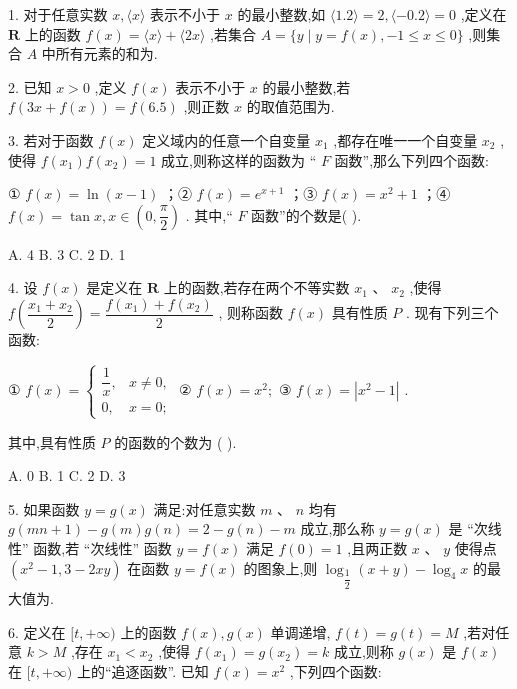 1. 对于任意实数 $x,\langle x\rangle$ 表示不小于 $x$ 的最小整数,如 $\langle {1.2}\rangle  = 2,\langle  - {0.2}\rangle  = 0$ ,定义在 $\mathbf{R}$ 上的函数 $f\left( x\right)  = \langle x\rangle  + \langle {2x}\rangle$ ,若集合 $A = \{ y \mid  y = f\left( x\right) , - 1 \leq  x \leq  0\}$ ,则集合 $A$ 中所有元素的和为\blkda{}.

2. 已知 $x > 0$ ,定义 $f\left( x\right)$ 表示不小于 $x$ 的最小整数,若 $f\left( {{3x} + f\left( x\right) }\right)  = f\left( {6.5}\right)$ ,则正数 $x$ 的取值范围为\blkda{}.

3. 若对于函数 $f\left( x\right)$ 定义域内的任意一个自变量 ${x}_{1}$ ,都存在唯一一个自变量 ${x}_{2}$ ,使得 $f\left( {x}_{1}\right) f\left( {x}_{2}\right)  = 1$ 成立,则称这样的函数为 “ $F$ 函数”,那么下列四个函数:

① $f\left( x\right)  = \ln \left( {x - 1}\right)$ ；② $f\left( x\right)  = {{e}}^{x + 1}$ ；③ $f\left( x\right)  = {x}^{2} + 1$ ；④ $f\left( x\right)  = \tan x,x \in  \left( {0,\dfrac{\pi }{2}}\right)$ . 其中,“ $F$ 函数”的个数是(   ).

A. 4 B. 3 C. 2 D. 1

4. 设 $f\left( x\right)$ 是定义在 $\mathbf{R}$ 上的函数,若存在两个不等实数 ${x}_{1}\text{ 、 }{x}_{2}$ ,使得 $f\left( \dfrac{{x}_{1} + {x}_{2}}{2}\right)  = \dfrac{f\left( {x}_{1}\right)  + f\left( {x}_{2}\right) }{2}$ , 则称函数 $f\left( x\right)$ 具有性质 $P$ . 现有下列三个函数:

① $f\left( x\right)  = \left\{  \begin{array}{ll} \dfrac{1}{x}, & x \neq  0, \\  0, & x = 0; \end{array}\right.$ ② $f\left( x\right)  = {x}^{2};$ ③ $f\left( x\right)  = \left| {{x}^{2} - 1}\right|$ .

其中,具有性质 $P$ 的函数的个数为 (   ).

A. 0 B. 1 C. 2 D. 3

5. 如果函数 $y = g\left( x\right)$ 满足:对任意实数 $m$ 、 $n$ 均有 $g\left( {{mn} + 1}\right)  - g\left( m\right) g\left( n\right)  = 2 - g\left( n\right)  - m$ 成立,那么称 $y = g\left( x\right)$ 是 “次线性” 函数,若 “次线性” 函数 $y = f\left( x\right)$ 满足 $f\left( 0\right)  = 1$ ,且两正数 $x\text{ 、 }y$ 使得点 $\left( {{x}^{2} - 1,3 - {2xy}}\right)$ 在函数 $y = f\left( x\right)$ 的图象上,则 ${\log }_{\dfrac{1}{2}}\left( {x + y}\right)  - {\log }_{4}x$ 的最大值为\blkda{}.

6. 定义在 $\lbrack t, + \infty )$ 上的函数 $f\left( x\right) ,g\left( x\right)$ 单调递增, $f\left( t\right)  = g\left( t\right)  = M$ ,若对任意 $k > M$ ,存在 ${x}_{1} < {x}_{2}$ ,使得 $f\left( {x}_{1}\right)  = g\left( {x}_{2}\right)  = k$ 成立,则称 $g\left( x\right)$ 是 $f\left( x\right)$ 在 $\lbrack t, + \infty )$ 上的“追逐函数”. 已知 $f\left( x\right)  = {x}^{2}$ ,下列四个函数:

